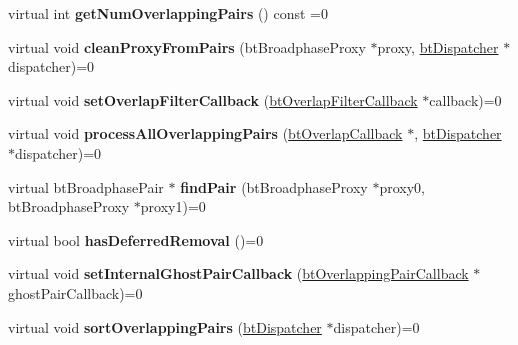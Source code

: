\begin{DoxyCompactItemize}
\item 
\mbox{\label{classbtOverlappingPairCache_a1891ba8fa73578f6d07aa9a67abcdb96}} 
virtual int {\bfseries get\+Num\+Overlapping\+Pairs} () const =0
\item 
\mbox{\label{classbtOverlappingPairCache_a31a0b857f0eb4e2484be6dcc468a6d36}} 
virtual void {\bfseries clean\+Proxy\+From\+Pairs} (bt\+Broadphase\+Proxy $\ast$proxy, \hyperlink{classbtDispatcher}{bt\+Dispatcher} $\ast$dispatcher)=0
\item 
\mbox{\label{classbtOverlappingPairCache_a397db584fa4dbec851447d3911507509}} 
virtual void {\bfseries set\+Overlap\+Filter\+Callback} (\hyperlink{structbtOverlapFilterCallback}{bt\+Overlap\+Filter\+Callback} $\ast$callback)=0
\item 
\mbox{\label{classbtOverlappingPairCache_a64d66749a8f8f1bd3bc877d4ac1371f3}} 
virtual void {\bfseries process\+All\+Overlapping\+Pairs} (\hyperlink{structbtOverlapCallback}{bt\+Overlap\+Callback} $\ast$, \hyperlink{classbtDispatcher}{bt\+Dispatcher} $\ast$dispatcher)=0
\item 
\mbox{\label{classbtOverlappingPairCache_ac1054ce61178f557462e8d3840752d08}} 
virtual bt\+Broadphase\+Pair $\ast$ {\bfseries find\+Pair} (bt\+Broadphase\+Proxy $\ast$proxy0, bt\+Broadphase\+Proxy $\ast$proxy1)=0
\item 
\mbox{\label{classbtOverlappingPairCache_aec4b6f27f7a6f6ef39ff4e37cf3f4514}} 
virtual bool {\bfseries has\+Deferred\+Removal} ()=0
\item 
\mbox{\label{classbtOverlappingPairCache_ae6e64aa73906582205655edb1de9b4d5}} 
virtual void {\bfseries set\+Internal\+Ghost\+Pair\+Callback} (\hyperlink{classbtOverlappingPairCallback}{bt\+Overlapping\+Pair\+Callback} $\ast$ghost\+Pair\+Callback)=0
\item 
\mbox{\label{classbtOverlappingPairCache_ac1d730243d65b184d3e9a5f0c8bc5f00}} 
virtual void {\bfseries sort\+Overlapping\+Pairs} (\hyperlink{classbtDispatcher}{bt\+Dispatcher} $\ast$dispatcher)=0
\end{DoxyCompactItemize}


